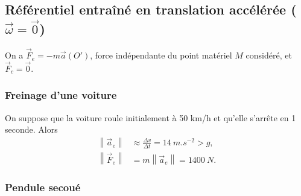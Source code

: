     \subsection[Référentiel entraîné en translation accélérée]{Référentiel entraîné en translation accélérée ($\vec{\omega}=\vec{0}$)}

        On a $\vec{F}_e=-m\vec{a}(O')$, force indépendante du point matériel $M$ considéré, et $\vec{F}_c=\vec{0}$.

        \subsubsection{Freinage d'une voiture}

            On suppose que la voiture roule initialement à 50 km/h et qu'elle s'arrête en 1 seconde. Alors
            \begin{equation*}
                \begin{aligned}
                    \left\lVert\vec{a}_e\right\rVert&\approx\frac{\Delta v}{\Delta t}=14~m.s^{-2}>g,\\
                    \left\lVert\vec{F}_e\right\rVert&=m\left\lVert \vec{a}_e\right\rVert=1400~N.
                \end{aligned}
            \end{equation*}

        \subsubsection{Pendule secoué}

